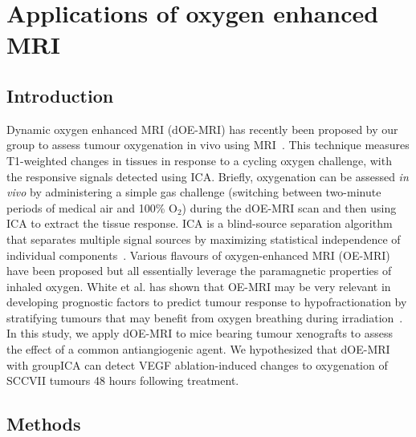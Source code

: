 
\chapter{Applications of oxygen enhanced MRI}
\label{ch:oemri3}

\section{Introduction}

Dynamic oxygen enhanced MRI (\ac{dOE-MRI}) has recently been proposed by our group to assess tumour oxygenation in vivo using MRI~\cite{Moosvi:2018ca}. 
This technique measures T1-weighted changes in tissues in response to a cycling oxygen challenge, with the responsive signals detected using \ac{ICA}. 
Briefly, oxygenation can be assessed \emph{in vivo} by administering a simple gas challenge (switching between two-minute periods of medical air and 100\% O$_2$) during the \ac{dOE-MRI} scan and then using \ac{ICA} to extract the tissue response.
\ac{ICA} is a blind-source separation algorithm that separates multiple signal sources by maximizing statistical independence of individual components~\cite{Hyvarinen:2000vk}.
Various flavours of oxygen-enhanced MRI (OE-MRI) have been proposed but all essentially leverage the paramagnetic properties of inhaled oxygen.
White et al. has shown that OE-MRI may be very relevant in developing prognostic factors to predict tumour response to hypofractionation by stratifying tumours that may benefit from oxygen breathing during irradiation~\cite{White:2016fz}.
In this study, we apply \ac{dOE-MRI} to mice bearing tumour xenografts to assess the effect of a common antiangiogenic agent.
We hypothesized that \ac{dOE-MRI} with group\ac{ICA} can detect VEGF ablation-induced changes to oxygenation of SCCVII tumours 48 hours following treatment.

\section{Methods}
